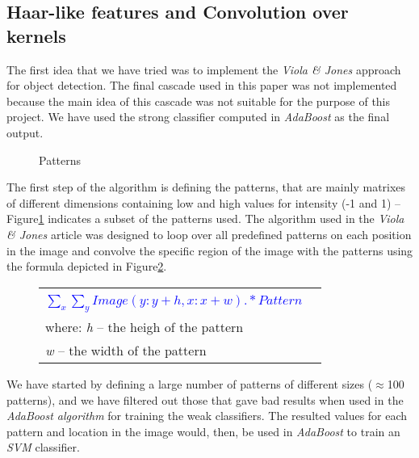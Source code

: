 \documentclass[11pt,twocolumn]{article}
\begin{document}
	\subsection{Haar-like features and Convolution over kernels}\label{sec:Haar}
	\hspace*{10px}The first idea that we have tried was to implement the \emph{Viola \& Jones} approach for object detection. The final cascade used in this paper was not implemented because the main idea of this cascade was not suitable for the purpose of this project. We have used the strong classifier computed in \emph{AdaBoost} as the final output.\\
\begin{figure}[!hbtp]
\caption{Patterns}
\label{patterns}
\end{figure}
	\hspace*{10px}The first step of the algorithm is defining the patterns, that are mainly matrixes of different dimensions containing low and high values for intensity (-1 and 1) -- Figure\ref{patterns} indicates a subset of the patterns used. The algorithm used in the \emph{Viola \& Jones} article was designed to loop over all predefined patterns on each position in the image and convolve the specific region of the image with the patterns using the formula depicted in Figure\ref{patterns_formula}.\\
\begin{figure}
\selectfont\small
\caption{}
\begin{tabular}{|lr|} \hline
	& \\[5pt]
	\textcolor{blue}{$\sum_x\sum_y Image(y:y+h,x:x+w) .* Pattern$} &\\[10pt]
	where: \emph{h} -- the heigh of the pattern &\\
	\hspace*{28px} \emph{w} -- the width of the pattern &\\[5pt] 
\hline 
\end{tabular}
\label{patterns_formula}
\end{figure}
\hspace*{10px}We have started by defining a large number of patterns of different sizes ($\approx$100 patterns), and we have filtered out those that gave bad results when used in the \emph{AdaBoost algorithm} for training the weak classifiers. The resulted values for each pattern and location in the image would, then, be used in \emph{AdaBoost} to train an \emph{SVM} classifier.\\
\end{document}

